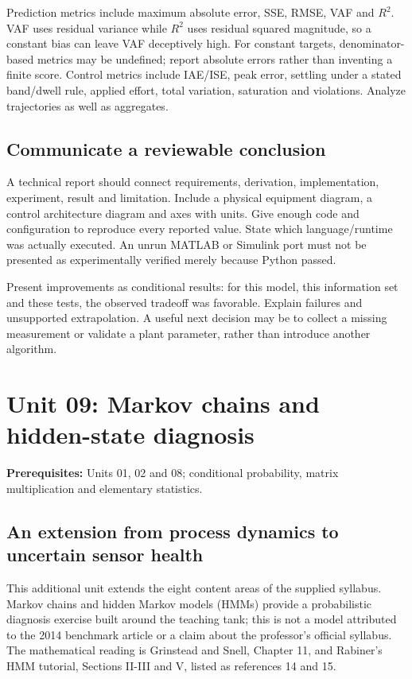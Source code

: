 \documentclass[11pt,a4paper]{article}
\begin{document}
Prediction metrics include maximum absolute error, SSE, RMSE, VAF and $R^2$. VAF uses residual variance while $R^2$ uses residual squared magnitude, so a constant bias can leave VAF deceptively high. For constant targets, denominator-based metrics may be undefined; report absolute errors rather than inventing a finite score. Control metrics include IAE/ISE, peak error, settling under a stated band/dwell rule, applied effort, total variation, saturation and violations. Analyze trajectories as well as aggregates.


\subsection{Communicate a reviewable conclusion}

A technical report should connect requirements, derivation, implementation, experiment, result and limitation. Include a physical equipment diagram, a control architecture diagram and axes with units. Give enough code and configuration to reproduce every reported value. State which language/runtime was actually executed. An unrun MATLAB or Simulink port must not be presented as experimentally verified merely because Python passed.


Present improvements as conditional results: for this model, this information set and these tests, the observed tradeoff was favorable. Explain failures and unsupported extrapolation. A useful next decision may be to collect a missing measurement or validate a plant parameter, rather than introduce another algorithm.

\clearpage\section{Unit 09: Markov chains and hidden-state diagnosis}
\textbf{Prerequisites:} Units 01, 02 and 08; conditional probability, matrix multiplication and elementary statistics.


\subsection{An extension from process dynamics to uncertain sensor health}

This additional unit extends the eight content areas of the supplied syllabus. Markov chains and hidden Markov models (HMMs) provide a probabilistic diagnosis exercise built around the teaching tank; this is not a model attributed to the 2014 benchmark article or a claim about the professor's official syllabus. The mathematical reading is Grinstead and Snell, Chapter 11, and Rabiner's HMM tutorial, Sections II-III and V, listed as references 14 and 15.
\end{document}
